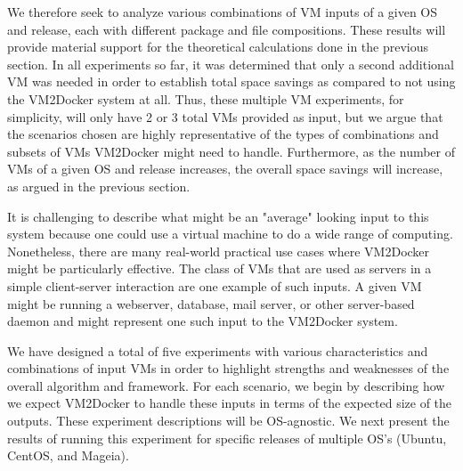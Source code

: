 We therefore seek to analyze various combinations of VM inputs of a given OS and release, each with different package and file compositions. These results will provide material support for the theoretical calculations done in the previous section. In all experiments so far, it was determined that only a second additional VM was needed in order to establish total space savings as compared to not using the VM2Docker system at all. Thus, these multiple VM experiments, for simplicity, will only have 2 or 3 total VMs provided as input, but we argue that the scenarios chosen are highly representative of the types of combinations and subsets of VMs VM2Docker might need to handle. Furthermore, as the number of VMs of a given OS and release increases, the overall space savings will increase, as argued in the previous section.

It is challenging to describe what might be an "average" looking input to this system because one could use a virtual machine to do a wide range of computing. Nonetheless, there are many real-world practical use cases where VM2Docker might be particularly effective. The class of VMs that are used as servers in a simple client-server interaction are one example of such inputs. A given VM might be running a webserver, database, mail server, or other server-based daemon and might represent one such input to the VM2Docker system. 

We have designed a total of five experiments with various characteristics and combinations of input VMs in order to highlight strengths and weaknesses of the overall algorithm and framework. For each scenario, we begin by describing how we expect VM2Docker to handle these inputs in terms of the expected size of the outputs. These experiment descriptions will be OS-agnostic. We next present the results of running this experiment for specific releases of multiple OS's (Ubuntu, CentOS, and Mageia). 

